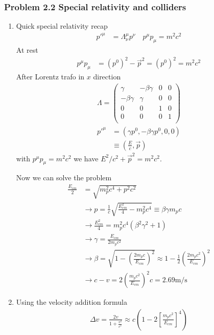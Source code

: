 \documentclass[10pt,a4paper]{article}
\theoremstyle{definition}
\begin{document}
\subsubsection{Problem 2.2 Special relativity and colliders}
\begin{enumerate}
    \item Quick special relativity recap
    \begin{align}
        p'^\mu&=\Lambda^\mu_\nu p^\nu\quad p^\mu p_\mu=m^2c^2
    \end{align}
    At rest
    \begin{align}
        p^\mu p_\mu&=(p^0)^2-\vec{p}^2=(p^0)^2=m^2c^2
    \end{align}
    After Lorentz trafo in $x$ direction
    \begin{align}
        \Lambda=\begin{pmatrix}
        \gamma & -\beta\gamma & 0 & 0\\
        -\beta\gamma & \gamma & 0 & 0\\
        0 & 0 & 1 & 0\\
        0 & 0 & 0 & 1\\
        \end{pmatrix}
    \end{align}
    \begin{align}
        p'^\mu&=(\gamma p^0,-\beta\gamma p^0,0,0)\\
        &\equiv\left(\frac{E}{c},\vec{p}\right)
    \end{align}
    with $p^\mu p_\mu=m^2c^2$ we have $E^2/c^2+\vec{p}^2=m^2c^2$.
    
    Now we can solve the problem
    \begin{align}
        \frac{E_{cm}}{2}&=\sqrt{m_p^2c^4+p^2c^2}\\
        &\rightarrow p = \frac{1}{c}\sqrt{\frac{E_{cm}^2}{4}-m_p^2c^4}\equiv\beta\gamma m_pc\\
        &\rightarrow \frac{E_{cm}^2}{4}=m_p^2c^4(\beta^2\gamma^2+1)\\
        &\rightarrow \gamma=\frac{E_{cm}}{2m_pc^2}\\
        &\rightarrow\beta=\sqrt{1-\left(\frac{2m_pc}{E_{cm}}\right)^2}\approx1-\frac{1}{2}\left(\frac{2m_pc^2}{E_{cm}}\right)^2\\
        &\rightarrow c-v=2\left(\frac{m_pc^2}{E_{cm}}\right)^2c=2.69\text{m/s}
    \end{align}
    \item Using the velocity addition formula
    \begin{align}
        \Delta v=\frac{2v}{1+\frac{v^2}{c^2}}\approx c\left(1-2\left[\frac{m_pc^2}{E_{cm}}\right]^4\right)
    \end{align}
\end{enumerate}
\end{document}
